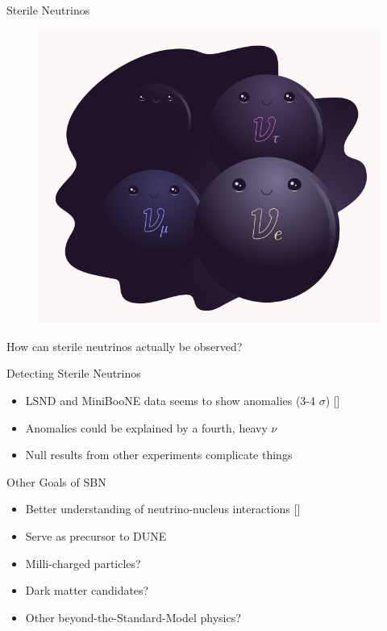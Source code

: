 \documentclass{beamer}
\begin{document}
\begin{frame}{Sterile Neutrinos}
\begin{figure}
    \centering
    \includegraphics[width = 0.4\linewidth]{umn/sterile-neutrinos.jpg}
    \label{fig:sterile-neutrinos}
\end{figure} \pause

\begin{center}
    How can sterile neutrinos actually be observed?
\end{center}
\end{frame}

\begin{frame}{Detecting Sterile Neutrinos}
    \begin{itemize}
        \item LSND and MiniBooNE data seems to show anomalies (3-4 $\sigma$) \footnotesize[\cite{SBN-Paper}]\normalsize
        \vspace{0.5cm}
        \item Anomalies could be explained by a fourth, heavy $\nu$
        \vspace{0.5 cm}
        \item Null results from other experiments complicate things
    \end{itemize}
\end{frame}

\begin{frame}{Other Goals of SBN}
    \begin{itemize}
        \item Better understanding of neutrino-nucleus interactions \footnotesize[\cite{SBN-Paper}]\normalsize
        \vspace{0.5cm}
        \item Serve as precursor to DUNE
        \vspace{0.5cm}
        \item Milli-charged particles?
        \vspace{0.5cm}
        \item Dark matter candidates?
        \vspace{0.5cm}
        \item Other beyond-the-Standard-Model physics?
    \end{itemize} 
\end{frame}
\end{document}
